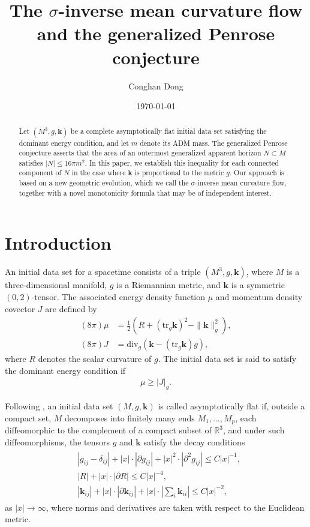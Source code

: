 \documentclass[11pt, letterpaper]{amsart}
\title[The $\sigma $-IMCF and the generalized Penrose conjecture]{The $\sigma $-inverse mean curvature flow and the generalized Penrose conjecture}
\author{Conghan Dong}
\theoremstyle{definition}
\theoremstyle{remark}
\begin{document}
\date{\today}

\maketitle

\begin{abstract}
	Let $(M^3, g, \mathbf{k})$ be a complete asymptotically flat initial data set satisfying the dominant energy condition, and let $m$ denote its ADM mass. The generalized Penrose conjecture asserts that the area of an outermost generalized apparent horizon $N\subset M$ satisfies $|N| \leq 16 \pi m^2$. In this paper, we establish this inequality for each connected component of $N$ in the case where $\mathbf{k}$ is proportional to the metric $g$. Our approach is based on a new geometric evolution, which we call the $\sigma $-inverse mean curvature flow, together with a novel monotonicity formula that may be of independent interest.
\end{abstract}

\section{Introduction}


 

An initial data set for a spacetime consists of a triple $(M^3, g, \mathbf{k})$, where $M$ is a three-dimensional manifold, $g$ is a Riemannian metric, and $\mathbf{k}$ is a symmetric $(0,2)$-tensor. The associated energy density function $\mu $ and momentum density covector $J$ are defined by
\begin{align*}
	(8 \pi ) \mu &= \frac{1}{2}\left( R + (\mathrm{tr}_g \mathbf{k})^2 - \|\mathbf{k}\|^2_g \right) ,\\
	(8 \pi ) J &= \mathrm{div}_g \left( \mathbf{k} - (\mathrm{tr}_g \mathbf{k} ) g \right) ,
\end{align*} 
where $R$ denotes the scalar curvature of $g$. The initial data set is said to satisfy the dominant energy condition if
\begin{align*}
	\mu \geq |J|_g.
\end{align*} 

Following \cite{SchoenYau81}, an initial data set $(M, g, \mathbf{k})$ is called asymptotically flat if, outside a compact set, $M$ decomposes into finitely many ends $M_1, \ldots, M_{p}$, each diffeomorphic to the complement of a compact subset of $\mathbb{R}^{3}$, and under such diffeomorphisms, the tensors $g$ and $\mathbf{k}$ satisfy the decay conditions
\begin{align}\label{AF-condition-0}
	\begin{split}
		&|g_{ij} - \delta _{ij}| + |x| \cdot |\partial g_{ij}| + |x|^2 \cdot |\partial ^2 g_{ij}| \leq C |x| ^{-1},\\
	& |R| + |x| \cdot |\partial R| \leq C |x|^{-4},\\
	& |\mathbf{k}_{ij}| + |x|\cdot  |\partial \mathbf{k}_{ij}|  + |x|\cdot  \left| \textstyle \sum_{i} \mathbf{k}_{ii}\right|  \leq C |x|^{-2},
	\end{split}
\end{align} 
as $|x|\to \infty$, where norms and derivatives are taken with respect to the Euclidean metric. 
\end{document}
